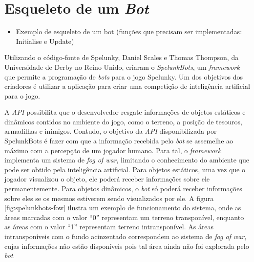 \section{Esqueleto de um \textit{Bot}}
\begin{mdframed}[backgroundcolor=green!20]
\begin{itemize}
    \item
		Exemplo de esqueleto de um bot (funções que precisam ser implementadas:
		Initialise e Update)
\end{itemize}
\end{mdframed}


Utilizando o código-fonte de Spelunky, Daniel Scales e Thomas Thompson, da
Universidade de Derby no Reino Unido, criaram o
\textit{SpelunkBots}\cite{SPELUNKBOTSPAPER}, um
\textit{framework} que permite a programação de \textit{bots} para o jogo
Spelunky. Um dos objetivos dos criadores é utilizar a aplicação para criar uma
competição de inteligência artificial para o jogo.

A \textit{API} possibilita que o desenvolvedor resgate informações de objetos
estáticos e dinâmicos contidos no ambiente do jogo, como o terreno, a
posição de tesouros, armadilhas e inimigos. Contudo, o objetivo da \textit{API}
disponibilizada por SpelunkBots é fazer com que a informação recebida pelo
\textit{bot} se assemelhe ao máximo com a percepção de um jogador humano.  Para
tal, o \textit{framework} implementa um sistema de \textit{fog of war},
limitando o conhecimento do ambiente que pode ser obtido pela inteligência
artificial. Para objetos estáticos, uma vez que o jogador visualizou o objeto,
ele poderá receber informações sobre ele permanentemente. Para objetos
dinâmicos, o \textit{bot} só poderá receber informações sobre eles se os mesmos
estiverem sendo visualizados por ele. A figura \ref{fig:spelunkbots-fow} ilustra
um exemplo de funcionamento do sistema, onde as áreas marcadas com o valor ``0''
representam um terreno transponível, enquanto as áreas com o valor ``1''
representam terreno intransponível. As áreas intransponíveis com o fundo
acinzentado correspondem ao sistema de \textit{fog of war}, cujas informações
não estão disponíveis pois tal área ainda não foi explorada pelo \textit{bot}.

